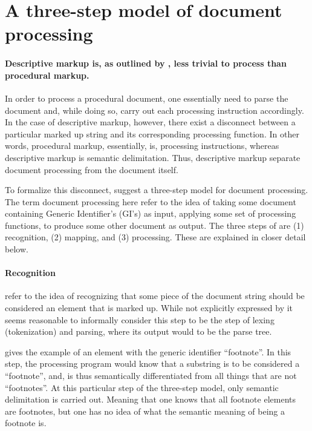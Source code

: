 \documentclass{scrreprt}
\begin{document}
%
%
%
%
%
%

\section{A three-step model of document processing}
\label{sec:three-step-model}
\paragraph{Descriptive markup is, as outlined by \citet{goldfarb}, less trivial to process than procedural markup.} In order to process a procedural document, one essentially need to parse the document and, while doing so, carry out each processing instruction accordingly. In the case of descriptive markup, however, there exist a disconnect between a particular marked up string and its corresponding processing function. In other words, procedural markup, essentially, is, processing instructions, whereas descriptive markup is semantic delimitation. Thus, descriptive markup separate document processing from the document itself.

To formalize this disconnect, \citet{goldfarb} suggest a three-step model for document processing. The term document processing here refer to the idea of taking some document containing Generic Identifier's (GI's) as input, applying some set of processing functions, to produce some other document as output. The three steps of \citet{goldfarb} are (1) recognition, (2) mapping, and (3) processing. These are explained in closer detail below.

\paragraph{Recognition} refer to the idea of recognizing that some piece of the document string should be considered an element that is marked up. While not explicitly expressed by \citet{goldfarb} it seems reasonable to informally consider this step to be the step of lexing (tokenization) and parsing, where its output would to be the parse tree.

\citet{goldfarb} gives the example of an element with the generic identifier ``footnote''. In this step, the processing program would know that a substring is to be considered a ``footnote'', and, is thus semantically differentiated from all things that are not ``footnotes''. At this particular step of the three-step model, only semantic delimitation is carried out. Meaning that one knows that all footnote elements are footnotes, but one has no idea of what the semantic meaning of being a footnote is.
\end{document}
